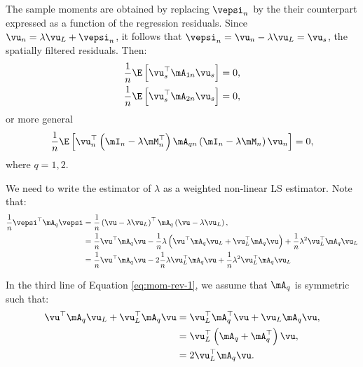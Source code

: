 \documentclass[english,12pt]{book}\usepackage[]{graphicx}\usepackage[]{xcolor}
\begin{document}
The sample moments are obtained by replacing $\vepsi_n$ by the their counterpart expressed as a function of the regression residuals. Since $\vu_n = \lambda \vu_L + \vepsi_n$, it follows that $\vepsi_n = \vu_n - \lambda \vu_L =\vu_s$, the spatially filtered residuals. Then:
\begin{equation}\label{eq:moment_conditions_reduced_u}
	\begin{aligned}
\frac{1}{n}\E\left[\vu_s^\top\mA_{1n}\vu_s\right] & =  0, \\
\frac{1}{n}\E\left[\vu_s^\top\mA_{2n}\vu_s\right] & =  0,
	\end{aligned}
\end{equation}
%
or more general
\begin{equation}\label{eq:moment_conditions_reduced_u_b}
\frac{1}{n}\E\left[\vu^\top_n\left(\mI_n - \lambda \mM^\top_n\right)\mA_{qn}\left(\mI_n - \lambda \mM_n\right)\vu_n\right] = 0, 
\end{equation}
%
where $q = 1, 2$. 

We need to write the estimator of $\lambda$ as a weighted non-linear LS estimator. Note that:
\begin{equation}\label{eq:mom-rev-1}
\begin{aligned}
  \frac{1}{n}\vepsi^\top\mA_q\vepsi & = \frac{1}{n}\left(\vu - \lambda \vu_L\right)^\top\mA_q\left(\vu - \lambda \vu_L\right), \\
                               & = \frac{1}{n}\vu^\top\mA_q\vu - \frac{1}{n}\lambda\left(\vu^\top\mA_q\vu_L + \vu_L^\top\mA_q\vu\right) +\frac{1}{n}\lambda^2\vu_L^\top\mA_q\vu_L \\
                               & = \frac{1}{n}\vu^\top\mA_q\vu - 2\frac{1}{n}\lambda\vu_L^\top\mA_q\vu +\frac{1}{n}\lambda^2\vu_L^\top\mA_q\vu_L \\
\end{aligned}
\end{equation}

In the third line of Equation \eqref{eq:mom-rev-1}, we assume that $\mA_q$ is symmetric such that:
\begin{equation*}
\begin{aligned}
\vu^\top\mA_q\vu_L + \vu_L^\top\mA_q\vu & = \vu_L^\top \mA_q^\top\vu + \vu_L\mA_q\vu, \\
                                        & = \vu_L^\top\left(\mA_q + \mA_q^\top\right) \vu, \\
                                        & = 2\vu_L^\top\mA_q\vu.
                                        \end{aligned}
\end{equation*}
\end{document}
